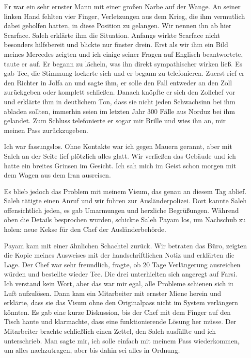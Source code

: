 Er war ein sehr ernster Mann mit einer großen Narbe auf der Wange. An seiner linken Hand fehlten vier Finger, Verletzungen aus dem Krieg, die ihm vermutlich dabei geholfen hatten, in diese Position zu gelangen. Wir nennen ihn ab hier Scarface. Saleh erklärte ihm die Situation. Anfangs wirkte Scarface nicht besonders hilfsbereit und blickte nur finster drein. Erst als wir ihm ein Bild meines Mercedes zeigten und ich einige seiner Fragen auf Englisch beantwortete, taute er auf. Er begann zu lächeln, was ihn direkt sympathischer wirken ließ. Es gab Tee, die Stimmung lockerte sich und er begann zu telefonieren. Zuerst rief er den Richter in Jolfa an und sagte ihm, er solle den Fall entweder an den Zoll zurückgeben oder komplett schließen. Danach knöpfte er sich den Zollchef vor und erklärte ihm in deutlichem Ton, dass sie nicht jeden Schwachsinn bei ihm abladen sollten, immerhin seien im letzten Jahr 300 Fälle aus Norduz bei ihm gelandet. Zum Schluss telefonierte er sogar mir Brille und wies ihn an, mir meinen Pass zurückzugeben.

Ich war fassungslos. Ohne Kontakte war ich gegen Mauern gerannt, aber mit Saleh an der Seite lief plötzlich alles glatt. Wir verließen das Gebäude und ich hatte ein breites Grinsen im Gesicht. Ich sah mich im Geist schon morgen mit dem Wagen aus dem Iran ausreisen.

Es blieb jedoch das Problem mit meinem Visum, das genau an diesem Tag ablief. Saleh tätigte einen Anruf und wir fuhren zur Ausländerpolizei. Dort kannte Saleh offensichtlich jeden, es gab Umarmungen und herzliche Begrüßungen. Während oben die Details besprochen wurden, schickte Saleh Payam los, um Nachschub zu holen: neue Kekse für den Chef der Ausländerbehörde.

Payam kam mit einer ähnlichen Schachtel zurück. Wir betraten das Büro, zeigten die Kopie meines Ausweises mit der handschriftlichen Notiz und erklärten die Lage. Der Chef war sehr freundlich, fragte, ob 20 Tage Verlängerung ausreichen würden und bestellte wieder Tee. Die drei unterhielten sich angeregt auf Farsi. Ich verstand kein Wort, aber das war mir egal, alle Probleme schienen sich in Luft aufzulösen. Dann kam ein Mitarbeiter mit ernster Miene herein und erklärte, dass sie das Visum ohne den Originalpass nicht im System verlängern könnten. Es gab eine kurze Diskussion, bis der Chef mit dem Finger auf den Tisch haute und klarmachte, dass eine funktionierende Lösung her müsse. Der Mitarbeiter brachte schließlich einen Zettel, den Saleh ausfüllte und ich unterschrieb. Man sagte mir, ich solle einfach mit meinem Pass wiederkommen, um alles nachzutragen, aber bis dahin sei alles in Ordnung.

